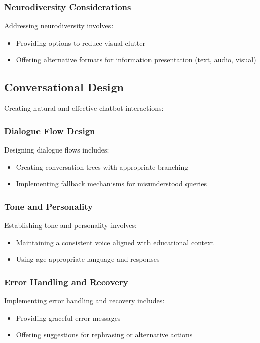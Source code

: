 \documentclass[15pt,a4paper]{article}
\begin{document}
\begin{multicols}{2}
\subsubsection*{Neurodiversity Considerations}
Addressing neurodiversity \textit{\parencite[pp. 30-60]{Armstrong2023}} involves:
\begin{itemize}
    \item Providing options to reduce visual clutter
    \item Offering alternative formats for information presentation (text, audio, visual)
\end{itemize}

\subsection{Conversational Design}
Creating natural and effective chatbot interactions:

\subsubsection*{Dialogue Flow Design}
Designing dialogue flows \textit{\parencite[pp. 40-80]{MooreArar2023}} includes:
\begin{itemize}
    \item Creating conversation trees with appropriate branching
    \item Implementing fallback mechanisms for misunderstood queries
\end{itemize}

\subsubsection*{Tone and Personality}
Establishing tone and personality \textit{\parencite[pp. 20-50]{Bradbury2024}} involves:
\begin{itemize}
    \item Maintaining a consistent voice aligned with educational context
    \item Using age-appropriate language and responses
\end{itemize}

\subsubsection*{Error Handling and Recovery}
Implementing error handling and recovery \textit{\parencite[pp. 100-150]{LemonPietquin2023}} includes:
\begin{itemize}
    \item Providing graceful error messages
    \item Offering suggestions for rephrasing or alternative actions
\end{itemize}


\end{multicols}
\end{document}
